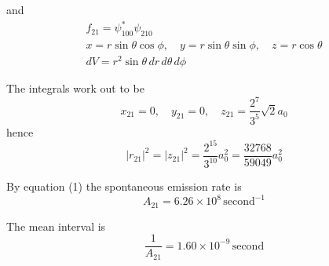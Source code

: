 and
\begin{gather*}
f_{21}=\psi_{100}^*\psi_{210}%
\\[1ex]
x=r\sin\theta\cos\phi,
\quad
y=r\sin\theta\sin\phi,
\quad
z=r\cos\theta
\\[1ex]
dV=r^2\sin\theta\,dr\,d\theta\,d\phi
\end{gather*}

The integrals work out to be
\begin{equation*}
x_{21}=0,
\quad
y_{21}=0,
\quad
z_{21}=\frac{2^7}{3^5}\sqrt2a_0
\end{equation*}
hence
\begin{equation*}
|r_{21}|^2=|z_{21}|^2=\frac{2^{15}}{3^{10}}a_0^2=\frac{32768}{59049}a_0^2
\end{equation*}

By equation (1) the spontaneous emission rate is
\begin{equation*}
A_{21}=6.26\times10^8\,\text{second}^{-1}
\end{equation*}

The mean interval is
\begin{equation*}
\frac{1}{A_{21}}=1.60\times10^{-9}\,\text{second}
\end{equation*}


